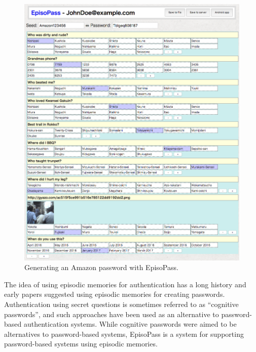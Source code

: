\documentclass[runningheads,a4paper]{llncs}
\begin{document}
\begin{figure}
\centering
\includegraphics[width=1.0\columnwidth]{figures/4d13e6804ba790624c1f8e2b8255bde5}
\caption{Generating an Amazon password with EpisoPass.}
\label{web1}
\end{figure}


The idea of using episodic memories for authentication has a long
history and early papers suggested using episodic memories for
creating passwords. Authentication using secret questions is sometimes
referred to as ``cognitive
passwords''\cite{Zviran:1990:UAC:100512.100538}, and such approaches
have been used as an alternative to password-based authentication
systems.
%
While cognitive passwords were aimed to be alternatives to
password-based systems, EpisoPass is a system for supporting
password-based systems using episodic memories.
\end{document}
